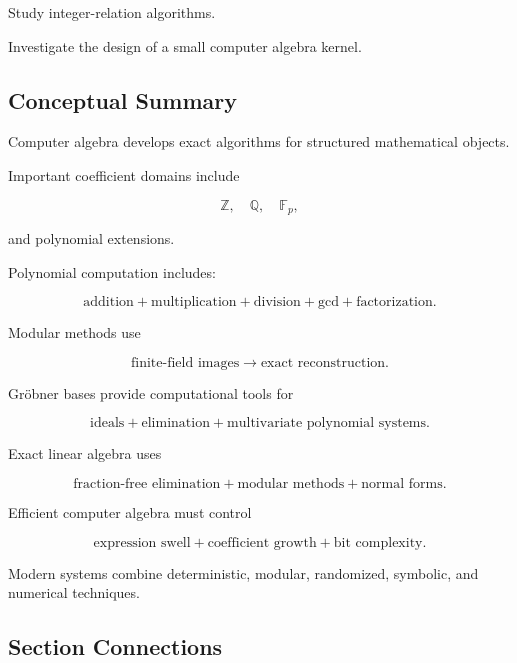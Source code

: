 \begin{exercise}[4]
Study integer-relation algorithms.
\end{exercise}

\begin{exercise}[4]
Investigate the design of a small computer algebra kernel.
\end{exercise}

\subsection{Conceptual Summary}
\label{subsec:computer-algebra-summary}

Computer algebra develops exact algorithms for structured mathematical
objects.

Important coefficient domains include

\[
\boxed{
\mathbb{Z},
\quad
\mathbb{Q},
\quad
\mathbb{F}_p,
}
\]

and polynomial extensions.

Polynomial computation includes:

\[
\boxed{
\text{addition}
+
\text{multiplication}
+
\text{division}
+
\text{gcd}
+
\text{factorization}.
}
\]

Modular methods use

\[
\boxed{
\text{finite-field images}
\rightarrow
\text{exact reconstruction}.
}
\]

Gröbner bases provide computational tools for

\[
\boxed{
\text{ideals}
+
\text{elimination}
+
\text{multivariate polynomial systems}.
}
\]

Exact linear algebra uses

\[
\boxed{
\text{fraction-free elimination}
+
\text{modular methods}
+
\text{normal forms}.
}
\]

Efficient computer algebra must control

\[
\boxed{
\text{expression swell}
+
\text{coefficient growth}
+
\text{bit complexity}.
}
\]

Modern systems combine deterministic, modular, randomized, symbolic, and
numerical techniques.

\subsection{Section Connections}
\label{subsec:computer-algebra-connections}

